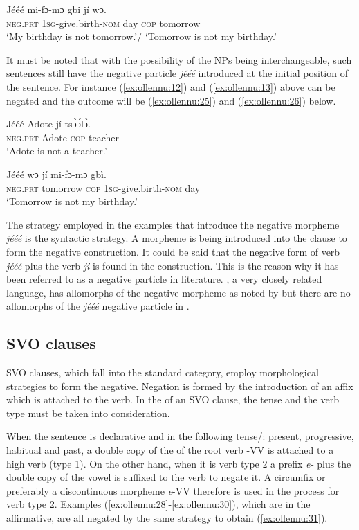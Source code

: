 \documentclass[output=paper,newtxmath,modfonts,nonflat,hidelinks]{langsci/langscibook}
\begin{document}
\ea \label{ex:ollennu:24}
\gll Jééé mi-fɔ-mɔ gbi jí wɔ.\\
\textsc{neg}.\textsc{prt} 1\textsc{sg}-give.birth-\textsc{nom} day \textsc{cop} tomorrow\\
\glt 	`My birthday is not tomorrow.'/ `Tomorrow is not my birthday.'
\z

It must be noted that with the possibility of the NPs being interchangeable, such sentences still have the {negative particle} \textit{jééé} introduced at the initial position of the sentence. For instance (\ref{ex:ollennu:12}) and (\ref{ex:ollennu:13}) above can be negated and the outcome will be (\ref{ex:ollennu:25}) and (\ref{ex:ollennu:26}) below.

\ea \label{ex:ollennu:25}
 \gll Jééé Adote jí ts\`ɔ\'ɔl\`ɔ. \\
\textsc{neg}.\textsc{prt} Adote \textsc{cop} teacher\\
\glt `Adote is not a teacher.'
\z

\ea \label{ex:ollennu:26}
\gll Jééé wɔ jí mi-fɔ-mɔ gbì.\\
\textsc{neg}.\textsc{prt} tomorrow \textsc{cop} 1\textsc{sg}-give.birth-\textsc{nom} day\\
\glt `Tomorrow is not my birthday.'
\z


The strategy employed in the examples that introduce the negative morpheme \textit{jééé} is the syntactic strategy. A morpheme is being introduced into the clause to form the negative construction. It could be said that the negative form of  verb \textit{jééé} plus the  verb \textit{ji} is found in the construction. This is the reason why it has been referred to as a {negative particle} in  literature. , a very closely related language, has allomorphs of the negative morpheme as noted by \citet{caesar2012} but there are no allomorphs of the \textit{jééé} {negative particle} in .

\subsection{\label{sec:ollennu:2.3} SVO clauses}

SVO clauses, which fall into the standard  category, employ morphological strategies to form the negative. Negation is formed by the introduction of an affix which is attached to the verb. In the  of an SVO clause, the tense and the verb type must be taken into consideration.

When the sentence is declarative and in the following tense/: present, progressive, habitual and past, a double copy of the  of the root verb -VV is attached to a high  verb (type 1). On the other hand, when it is verb type 2 a prefix \textit{e-} plus the double copy of the vowel is suffixed to the verb to negate it. A circumfix or preferably a discontinuous morpheme \textit{e}-VV therefore is used in the  process for verb type 2. Examples (\ref{ex:ollennu:28}-\ref{ex:ollennu:30}), which are in the affirmative, are all negated by the same strategy to obtain (\ref{ex:ollennu:31}).
\end{document}
